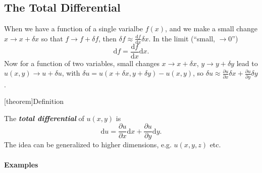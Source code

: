 \documentclass[12pt]{report}
\theoremstyle{definition}
\begin{document}
\subsection{The Total Differential}

When we have a function of a single varialbe $f(x)$,
and we make a small change $x \rightarrow{} x + \delta x$
so that $f \rightarrow{} f + \delta f$, then 
$\delta f \approx \frac{\mathrm{d}f}{\mathrm{d}x} \delta x$.
In the limit (``small, $\rightarrow{}0$'')\[
    \mathrm{d}f = \frac{\mathrm{d}f}{\mathrm{d}x} \mathrm{d}x.
\]
Now for a function of two variables, small changes $x \rightarrow{} x + \delta x$,
$y \rightarrow{} y + \delta y$ lead to $u(x,y) \rightarrow{} u + \delta u$,
with $\delta u = u(x+\delta x, y+\delta y) - u(x,y)$, so
$\delta u \approx \frac{\partial u}{\partial x} \delta x + \frac{\partial u}{\partial y} \delta y$.

[theorem]{Definition}
\begin{total differential}
    The \textbf{\emph{total differential}} of $u(x,y)$ is\[
    \mathrm{d}u = \frac{\partial u}{\partial x} \mathrm{d}x + \frac{\partial u}{\partial y} \mathrm{d}y.
\]
The idea can be generalized to higher dimensions, e.g. $u(x,y,z)$ etc.
\end{total differential}

\paragraph{Examples}
\,
\end{document}
